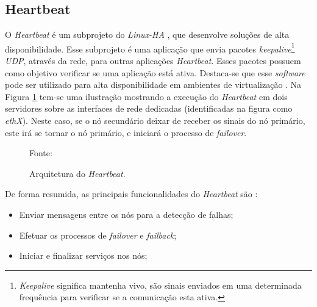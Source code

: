 
\subsection{Heartbeat}
\label{section:heartbeat}
O \textit{Heartbeat} é um subprojeto do \textit{Linux-HA} \cite{linuxha}, que desenvolve soluções de alta disponibilidade.
Esse subprojeto é uma aplicação que envia pacotes \textit{keepalive}\footnote{\textit{Keepalive} significa mantenha vivo, são sinais 
enviados em uma determinada frequência para verificar se a comunicação esta ativa.} \textit{\ac{UDP}}, 
através da rede, para outras aplicações \textit{Heartbeat}. Esses pacotes possuem como objetivo verificar se uma aplicação está ativa.
Destaca-se que esse \textit{software} pode ser utilizado para alta disponibilidade em ambientes de virtualização \cite{reis2009}.
Na Figura \ref{fig:heartbeat} tem-se uma ilustração mostrando a execução do \textit{Heartbeat} em dois servidores sobre as interfaces de rede 
dedicadas (identificadas na figura como \textit{ethX}).
Neste caso, se o nó secundário deixar de receber os sinais do nó primário, este irá se tornar o nó primário, e iniciará o processo de 
\textit{failover}. 
\begin{figure}[h!]
 \centering
 \caption{Arquitetura do \textit{Heartbeat}.}
 Fonte: \citet{zaminhani2008}
 \label{fig:heartbeat}
\end{figure}

\newpage
De forma resumida, as principais funcionalidades do \textit{Heartbeat} são \cite{clusterlabs}:
\begin{itemize}
 \item Enviar mensagens entre os nós para a detecção de falhas;
 \item Efetuar os processos de \textit{failover} e \textit{failback};
 \item Iniciar e finalizar serviços nos nós;
\end{itemize}

